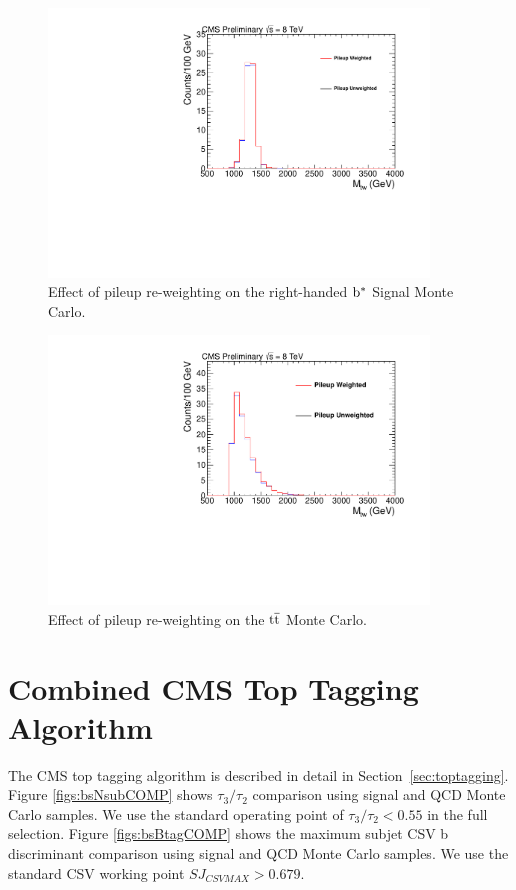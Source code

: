 \begin{figure}[htcb]
\centering
\includegraphics[width=0.9\textwidth]{AN-14-049/figs/Signal_M1300_PileupComp.pdf}
\caption{Effect of pileup re-weighting on the right-handed $\mathrm{b}^{*}$ Signal Monte Carlo.}
\label{figs:bspileup3}
\end{figure}

\begin{figure}[htcb]
\centering
\includegraphics[width=0.9\textwidth]{AN-14-049/figs/TTbar_PileupComp.pdf}
\caption{Effect of pileup re-weighting on the $\mathrm{t\overline{t}}$ Monte Carlo.}
\label{figs:bspileup3ttbar}
\end{figure}



\section{Combined CMS Top Tagging Algorithm}
\label{sec:bstoptagging}
\label{sec:bssubjetSF}
The CMS top tagging algorithm is described in detail in Section~\ref{sec:toptagging}.
Figure \ref{figs:bsNsubCOMP} shows $\tau_3/\tau_2$ comparison using signal and QCD Monte Carlo samples.  We use the standard operating point of $\tau_3/\tau_2 < 0.55$ in the full selection.
Figure \ref{figs:bsBtagCOMP} shows the maximum subjet CSV b discriminant comparison using signal and QCD Monte Carlo samples.  We use the standard CSV working point $SJ_{CSVMAX} > 0.679$.

